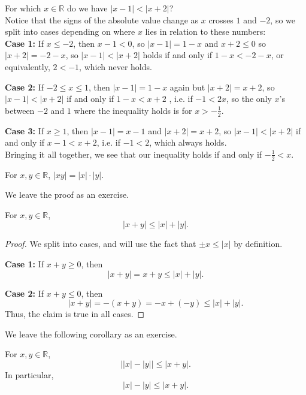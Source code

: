 \documentclass[11pt,dvipsnames]{book}
\numberwithin{equation}{section} %
\numberwithin{figure}{section} %
\numberwithin{table}{section} %
\begin{document}
\begin{example}
For which $x\in\mathbb{R}$ do we have $|x-1|<|x+2|$?\\

Notice that the signs of the absolute value change as $x$ crosses $1$ and $-2$, so we split into cases depending on where $x$ lies in relation to these numbers:\\

{\bf Case 1:} If $x\leq -2$, then $x-1<0$, so $|x-1|=1-x$ and $x+2\leq 0$ so $|x+2|=-2-x$, so $|x-1|<|x+2|$ holds if and only if $1-x<-2-x$, or equivalently, $2<-1$, which never holds.

{\bf Case 2:} If $-2\leq x\leq 1$, then $|x-1|=1-x$ again but $|x+2|=x+2$, so $|x-1|<|x+2|$  if and only if $1-x<x+2$ , i.e. if $-1<2x$, so the only $x$'s between $-2$ and $1$ where the inequality holds is for $x>-\frac{1}{2}$. 

{\bf Case 3:} If $x\geq 1$, then $|x-1|=x-1$ and $|x+2|=x+2$, so $|x-1|<|x+2|$ if and only if $x-1<x+2$, i.e. if $-1<2$, which always holds. \\

Bringing it all together, we see that our inequality holds if and only if $-\frac{1}{2}< x$.

\end{example}
\begin{lemma}
\label{l:|xy|=|x||y|}
For $x,y\in \mathbb{R}$, $|xy|=|x|\cdot |y|$. 
\end{lemma}

We leave the proof as an exercise. 

\begin{theorem}
For $x,y\in\mathbb{R}$, 
\[
|x+y|\leq |x|+|y|.
\]
\end{theorem}

\begin{proof}
We split into cases, and will use the fact that $\pm x\leq |x|$ by definition.

{\bf Case 1:}  If $x+y\geq 0$, then
\[
|x+y|=x+y\leq |x|+|y|.
\]

{\bf Case 2:}  If $x+y\leq 0$, then
\[
|x+y|=-(x+y)=-x+(-y)\leq |x|+|y|.
\]
Thus, the claim is true in all cases. 

\end{proof}

We leave the following corollary as an exercise.

\begin{corollary}
For $x,y\in\mathbb{R}$, 
\[
\bigl||x|-|y|\bigr|\leq |x+y|.
\]
In particular, 
\[
|x|-|y|\leq |x+y|.
\]

\end{corollary}
\end{document}
